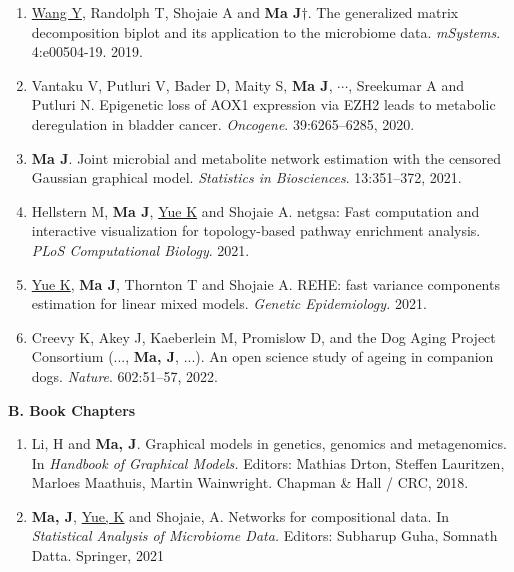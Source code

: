 \documentclass[10pt]{article}
\begin{document}
\begin{enumerate}
 \item \underline{Wang Y}, Randolph T, Shojaie A and \textbf{Ma J}{$\dagger$}. The generalized matrix decomposition biplot and its application to the microbiome data. {\em mSystems}. 4:e00504-19. 2019.
 \item Vantaku V, Putluri V, Bader D, Maity S, \textbf{Ma J}, $\cdots$, Sreekumar A and Putluri N. Epigenetic loss of AOX1 expression via EZH2 leads to metabolic deregulation in bladder cancer. {\em Oncogene}. 39:6265--6285, 2020.   
 \item \textbf{Ma J}. Joint microbial and metabolite network estimation with the censored Gaussian graphical model. {\em Statistics in Biosciences}. 13:351--372, 2021.
\item Hellstern M, \textbf{Ma J}, \underline{Yue K} and Shojaie A. netgsa: Fast computation and interactive visualization for topology-based pathway enrichment analysis. {\it PLoS Computational Biology}. 2021.
\item \underline{Yue K}, \textbf{Ma J}, Thornton T and Shojaie A. REHE: fast variance components estimation for linear mixed models. {\it Genetic Epidemiology.} 2021. 
\item Creevy K, Akey J, Kaeberlein M, Promislow D, and the Dog Aging Project Consortium (..., \textbf{Ma, J}, ...). An open science study of ageing in companion dogs. {\it Nature}. 602:51--57, 2022.
\end{enumerate}

\textbf{B. Book Chapters}
\begin{enumerate}
\item Li, H and \textbf{Ma, J}. Graphical models in genetics, genomics and metagenomics. In {\em Handbook of Graphical Models.} Editors: Mathias Drton, Steffen Lauritzen, Marloes Maathuis, Martin Wainwright. Chapman \& Hall / CRC, 2018.
\item \textbf{Ma, J}, \underline{Yue, K} and Shojaie, A. Networks for compositional data. In \emph{Statistical Analysis of Microbiome Data.} Editors: Subharup Guha, Somnath Datta. Springer, 2021
\end{enumerate}
\end{document}
